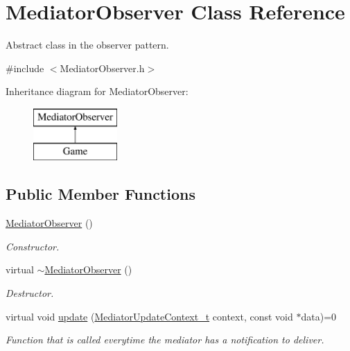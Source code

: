\hypertarget{classMediatorObserver}{
\section{MediatorObserver Class Reference}
\label{classMediatorObserver}
}


Abstract class in the observer pattern.  




{\ttfamily \#include $<$MediatorObserver.h$>$}

Inheritance diagram for MediatorObserver:\begin{figure}[H]
\begin{center}
\leavevmode
\includegraphics[height=2.000000cm]{classMediatorObserver}
\end{center}
\end{figure}
\subsection*{Public Member Functions}
\begin{DoxyCompactItemize}
\item 
\hypertarget{classMediatorObserver_afa3f47b657fb338cba632cf879396014}{
\hyperlink{classMediatorObserver_afa3f47b657fb338cba632cf879396014}{MediatorObserver} ()}
\label{classMediatorObserver_afa3f47b657fb338cba632cf879396014}

\begin{DoxyCompactList}\small\item\em Constructor. \item\end{DoxyCompactList}\item 
\hypertarget{classMediatorObserver_a62dee5cfedc7e97da55be0d2cd532f13}{
virtual \hyperlink{classMediatorObserver_a62dee5cfedc7e97da55be0d2cd532f13}{$\sim$MediatorObserver} ()}
\label{classMediatorObserver_a62dee5cfedc7e97da55be0d2cd532f13}

\begin{DoxyCompactList}\small\item\em Destructor. \item\end{DoxyCompactList}\item 
virtual void \hyperlink{classMediatorObserver_afc38ac71a1e8e0fc60fbfb4c195da44a}{update} (\hyperlink{namespaceMediatorUpdateContext_aa3a9bed543f2a2237dc2b6feea170a1d}{MediatorUpdateContext\_\-t} context, const void $\ast$data)=0
\begin{DoxyCompactList}\small\item\em Function that is called everytime the mediator has a notification to deliver. \item\end{DoxyCompactList}\end{DoxyCompactItemize}


